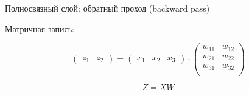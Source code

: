 \documentclass[notes,12pt, aspectratio=169]{beamer}
\newenvironment{wideitemize}{\itemize\addtolength{\itemsep}{10pt}}{\enditemize}
\begin{document}
\begin{frame}{Полносвязный слой: обратный проход (backward pass)}
\begin{wideitemize}

	\item Матричная запись: 
	
	\begin{equation*}
	\begin{pmatrix} z_1 & z_2 \end{pmatrix}  = \begin{pmatrix} x_1 & x_2 & x_3  \end{pmatrix}  \cdot  \begin{pmatrix} w_{11} & w_{12} \\ w_{21} & w_{22} \\ w_{31}  & w_{32} \\  \end{pmatrix}
	\end{equation*}
	
	\[ 
	Z  = X W 
	\]


%	
\end{wideitemize}
\end{frame}
\end{document}
